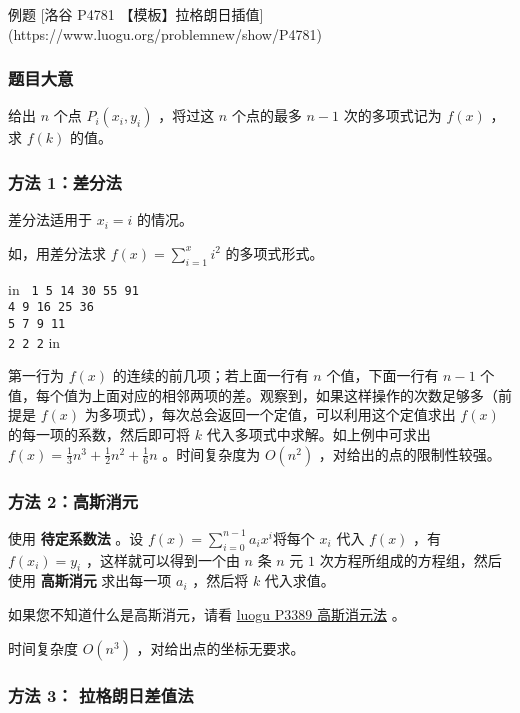 
\begin{NOTE}{ 例题 [洛谷 P4781 【模板】拉格朗日插值](https://www.luogu.org/problemnew/show/P4781)}{}

\end{NOTE}


\subsubsection{题目大意}

给出 $n$ 个点 $P_i(x_i,y_i)$ ，将过这 $n$ 个点的最多 $n-1$ 次的多项式记为 $f(x)$ ，求 $f(k)$ 的值。

\subsubsection{方法 1：差分法}

差分法适用于 $x_i=i$ 的情况。

如，用差分法求 $f(x)=\sum_{i=1}^{x} i^2$ 的多项式形式。

 in
\texttt{
1   5   14   30   55   91\\  4   9    16   25   36\\    5   7     9   11\\      2    2    2}
 in

第一行为 $f(x)$ 的连续的前几项；若上面一行有 $n$ 个值，下面一行有 $n-1$ 个值，每个值为上面对应的相邻两项的差。观察到，如果这样操作的次数足够多（前提是 $f(x)$ 为多项式），每次总会返回一个定值，可以利用这个定值求出 $f(x)$ 的每一项的系数，然后即可将 $k$ 代入多项式中求解。如上例中可求出 $f(x)=\frac 1 3 n^3+\frac 1 2 n^2+\frac 1 6 n$ 。时间复杂度为 $O(n^2)$ ，对给出的点的限制性较强。

\subsubsection{方法 2：高斯消元}

使用 \textbf{ 待定系数法 } 。设 $f(x)=\sum_{i=0}^{n-1} a_ix^i$将每个 $x_i$ 代入 $f(x)$ ，有 $f(x_i)=y_i$ ，这样就可以得到一个由 $n$ 条 $n$ 元 $1$ 次方程所组成的方程组，然后使用 \textbf{ 高斯消元 } 求出每一项 $a_i$ ，然后将 $k$ 代入求值。

如果您不知道什么是高斯消元，请看 \href{https://www.luogu.org/problemnew/show/P3389}{luogu P3389 高斯消元法} 。

时间复杂度 $O(n^3)$ ，对给出点的坐标无要求。

\subsubsection{方法 3： 拉格朗日差值法}

